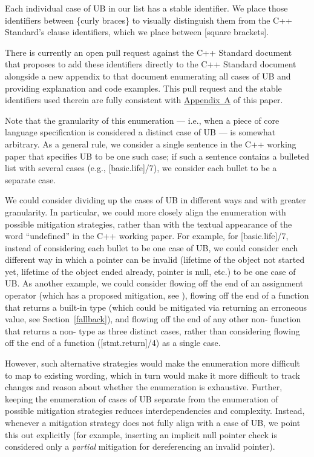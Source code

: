 Each individual case of UB in our list has a stable identifier. We place those identifiers between \{curly braces\} to visually distinguish them from the C++ Standard's clause identifiers, which we place between [square brackets]. 

There is currently an open pull request against the C++ Standard document that proposes to add these identifiers directly to the C++ Standard document alongside a new appendix to that document enumerating all cases of UB and providing explanation and code examples. This pull request and the stable identifiers used therein are fully consistent with \hyperref[appendix]{Appendix~A} of this paper. 

Note that the granularity of this enumeration --- i.e., when a piece of core language specification is considered a distinct case of UB --- is somewhat arbitrary. As a general rule, we consider a single sentence in the C++ working paper that specifies UB to be one such case; if such a sentence contains a bulleted list with several cases (e.g., [basic.life]/7), we consider each bullet to be a separate case.

We could consider dividing up the cases of UB in different ways and with greater granularity. In particular, we could more closely align the enumeration with possible mitigation strategies, rather than with the textual appearance of the word ``undefined'' in the C++ working paper. For example, for [basic.life]/7, instead of considering each bullet to be one case of UB, we could consider each different way in which a pointer can be invalid (lifetime of the object not started yet, lifetime of the object ended already, pointer is null, etc.) to be one case of UB. As another example, we could consider flowing off the end of an assignment operator (which has a proposed mitigation, see \cite{P2973R0}), flowing off the end of a function that returns a built-in type (which could be mitigated via returning an erroneous value, see Section~\ref{fallback}), and flowing off the end of any other non- function that returns a non- type as three distinct cases, rather than considering flowing off the end of a function ([stmt.return]/4) as a single case.

However, such alternative strategies would make the enumeration more difficult to map to existing wording, which in turn would make it more difficult to track changes and reason about whether the enumeration is exhaustive. Further, keeping the enumeration of cases of UB separate from the enumeration of possible mitigation strategies reduces interdependencies and complexity. Instead, whenever a mitigation strategy does not fully align with a case of UB, we point this out explicitly (for example, inserting an implicit null pointer check is considered only a \emph{partial} mitigation for dereferencing an invalid pointer).


